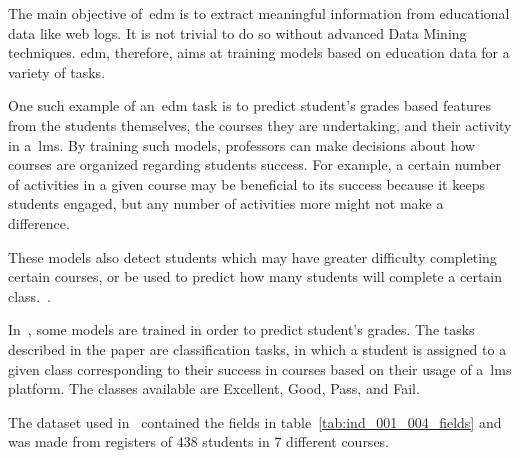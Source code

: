 The main objective of~\gls{edm} is to extract meaningful information from
educational data like web logs. It is not trivial to do so without advanced
Data Mining techniques. \gls{edm}, therefore, aims at training models based on
education data for a variety of tasks.

One such example of an~\gls{edm} task is to predict student's grades based
features from the students themselves, the courses they are undertaking, and
their activity in a~\gls{lms}. By training such models, professors can make
decisions about how courses are organized regarding students success. For
example, a certain number of activities in a given course may be beneficial to
its success because it keeps students engaged, but any number of activities
more might not make a difference.~\cite{ind_001, ind_002, ind_005}

These models also detect students which may have greater difficulty completing
certain courses, or be used to predict how many students will complete a
certain class.~\cite{ind_007, ind_008}.

In~\cite{ind_001}, some models are trained in order to predict student's
grades.  The tasks described in the paper are classification tasks, in which a
student is assigned to a given class corresponding to their success in courses
based on their usage of a~\gls{lms} platform. The classes available are
Excellent, Good, Pass, and Fail.

The dataset used in~\cite{ind_001} contained the fields in
table~\ref{tab:ind_001_004_fields} and was made from registers of 438 students
in 7 different courses.

